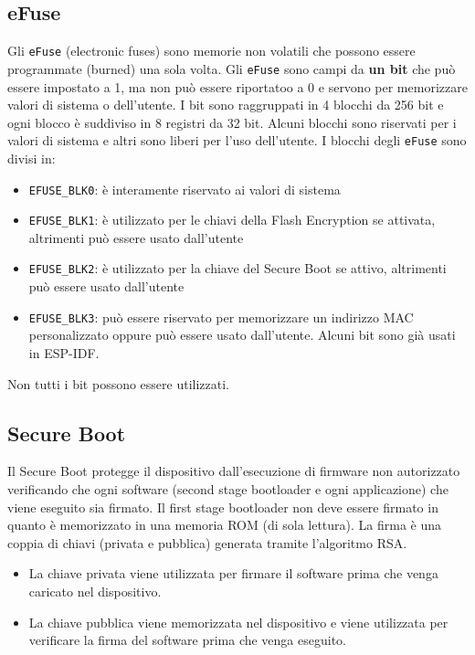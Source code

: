 \documentclass[a4paper]{article}
\begin{document}
\subsection{eFuse}
Gli \texttt{eFuse} (electronic fuses) sono memorie non volatili che possono essere
programmate (burned) una sola volta. Gli \texttt{eFuse} sono campi da \textbf{un bit}
che può essere impostato a 1, ma non può essere riportatoo a 0 e servono per memorizzare
valori di sistema o dell'utente. I bit sono raggruppati in 4 blocchi da 256 bit e 
ogni blocco è suddiviso in 8 registri da 32 bit. Alcuni blocchi sono riservati per i
valori di sistema e altri sono liberi per l'uso dell'utente.
I blocchi degli \texttt{eFuse} sono divisi in:
\begin{itemize}
  \item \texttt{EFUSE\_BLK0}: è interamente riservato ai valori di sistema
  \item \texttt{EFUSE\_BLK1}: è utilizzato per le chiavi della Flash Encryption se
    attivata, altrimenti può essere usato dall'utente
  \item \texttt{EFUSE\_BLK2}: è utilizzato per la chiave del Secure Boot se attivo,
    altrimenti può essere usato dall'utente
  \item \texttt{EFUSE\_BLK3}: può essere riservato per memorizzare un indirizzo MAC
    personalizzato oppure può essere usato dall'utente. Alcuni bit sono già usati
    in ESP-IDF.
\end{itemize}
Non tutti i bit possono essere utilizzati.

\subsection{Secure Boot}
Il Secure Boot protegge il dispositivo dall'esecuzione di firmware non autorizzato
verificando che ogni software (second stage bootloader e ogni applicazione)
che viene eseguito sia firmato. Il first stage bootloader non deve essere firmato
in quanto è memorizzato in una memoria ROM (di sola lettura).
La firma è una coppia di chiavi (privata e pubblica) generata tramite l'algoritmo
RSA.
\begin{itemize}
  \item La chiave privata viene utilizzata per firmare il software prima
    che venga caricato nel dispositivo.
  \item La chiave pubblica viene memorizzata nel dispositivo e viene utilizzata
    per verificare la firma del software prima che venga eseguito.
\end{itemize}
\end{document}
